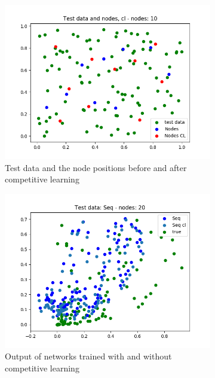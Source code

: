 \documentclass{article}
\begin{document}
\begin{figure}[ht!]
    \centering
    \begin{subfigure}[t]{0.4\textwidth}
        \centering
        \includegraphics[width=1\textwidth]{plots/2D/input_basic_both_cl_batch_test}
        \caption{Test data and the node positions before and after competitive learning}
    \end{subfigure}
    \begin{subfigure}[t]{0.4\textwidth}
        \centering
        \includegraphics[width=1\textwidth]{plots/2d/first_basic_both_CL_output_seq_test_20_sigma25}
        \caption{Output of networks trained with and without competitive learning}
    \end{subfigure}
    \caption{}
\end{figure}
\end{document}
